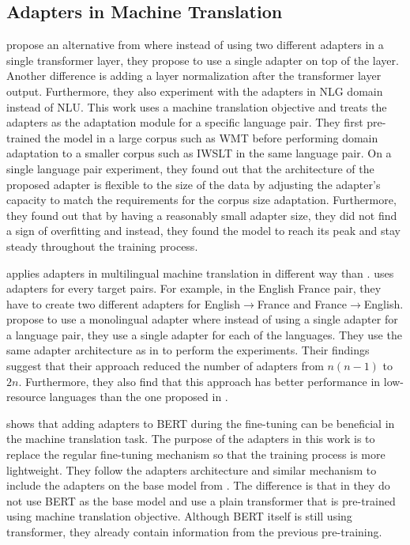 \subsection{Adapters in Machine Translation}
\label{sec:app_mt}
\cite{bapna2019simple} propose an alternative from \cite{houlsby2019parameter} where instead of using two different adapters in a single transformer layer, they propose to use a single adapter on top of the layer. Another difference is adding a layer normalization after the transformer layer output. Furthermore, they also experiment with the adapters in NLG domain instead of NLU. This work uses a machine translation objective and treats the adapters as the adaptation module for a specific language pair. They first pre-trained the model in a large corpus such as WMT before performing domain adaptation to a smaller corpus such as IWSLT in the same language pair. On a single language pair experiment, they found out that the architecture of the proposed adapter is flexible to the size of the data by adjusting the adapter's capacity to match the requirements for the corpus size adaptation. Furthermore, they found out that by having a reasonably small adapter size, they did not find a sign of overfitting and instead, they found the model to reach its peak and stay steady throughout the training process.

\cite{philip2020monolingual} applies adapters in multilingual machine translation in different way than \cite{bapna2019simple}. \cite{bapna2019simple} uses adapters for every target pairs. For example, in the English France pair, they have to create two different adapters for English$\rightarrow$France and France$\rightarrow$English. \cite{philip2020monolingual} propose to use a monolingual adapter where instead of using a single adapter for a language pair, they use a single adapter for each of the languages. They use the same adapter architecture as in \cite{bapna2019simple} to perform the experiments. Their findings suggest that their approach reduced the number of adapters from $n(n-1)$ to $2n$. Furthermore, they also find that this approach has better performance in low-resource languages than the one proposed in \cite{bapna2019simple}.

\cite{guo2021adaptive} shows that adding adapters to BERT during the fine-tuning can be beneficial in the machine translation task. The purpose of the adapters in this work is to replace the regular fine-tuning mechanism so that the training process is more lightweight. They follow the adapters architecture and similar mechanism to include the adapters on the base model from \cite{bapna2019simple}. The difference is that in \cite{bapna2019simple} they do not use BERT as the base model and use a plain transformer that is pre-trained using machine translation objective. Although BERT itself is still using transformer, they already contain information from the previous pre-training.


